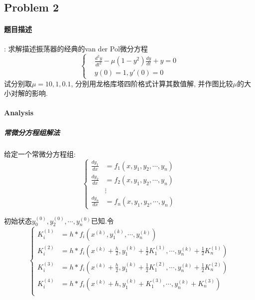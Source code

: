 \documentclass{article}
\begin{document}
\begin{CJK*}{UTF8}{song}
		\subsection{Problem 2}
			\paragraph{题目描述}
			:\newline
			求解描述振荡器的经典的van der Pol微分方程
			$$\left\{
				\begin{aligned}
					& \frac{d^2 y}{dt^2} - \mu \left(1-y^2 \right) \frac{dy}{dt} + y = 0 \\
					& y\left(0\right) = 1, y'\left(0 \right) = 0
				\end{aligned}
			\right.$$
			试分别取$\mu = 10, 1, 0.1$, 分别用龙格库塔四阶格式计算其数值解, 并作图比较$\mu$的大小对解的影响.
			
			\paragraph{Analysis}
			
			\subparagraph{常微分方程组解法}
			给定一个常微分方程组:
			$$\left\{
				\begin{aligned}
					\frac{dy_1}{dx} &= f_1\left(x,y_1,y_2,\cdots,y_n \right) \\
					\frac{dy_2}{dx} &= f_2\left(x,y_1,y_2,\cdots,y_n \right) \\
					&\vdots \\
					\frac{dy_n}{dx} &= f_n\left(x,y_1,y_2,\cdots,y_n \right)
				\end{aligned}
			\right.$$
			
			初始状态$y_0^{\left(0\right)}, y_2^{\left(0\right)}, \cdots, y_n^{\left(0\right)}$已知.令$$
			\left\{
				\begin{aligned}
					K_{i}^{\left(1\right)} &= h * f_i\left(x^{\left(k\right)},y_1^{\left(k\right)},\cdots,y_n^{\left(k\right)}\right) \\
					K_{i}^{\left(2\right)} &= h * f_i\left(x^{\left(k\right)} + \frac{h}{2}, y_1^{\left(k\right)} + \frac{1}{2}K_{1}^{\left(1\right)}, \cdots, y_n^{\left(k\right)} + \frac{1}{2}K_{n}^{\left(1\right)}\right) \\
					K_{i}^{\left(3\right)} &= h * f_i\left(x^{\left(k\right)} + \frac{h}{2}, y_1^{\left(k\right)} + \frac{1}{2}K_{1}^{\left(2\right)}, \cdots, y_n^{\left(k\right)} + \frac{1}{2}K_{n}^{\left(2\right)}\right) \\
					K_{i}^{\left(4\right)} &= h * f_i\left(x^{\left(k\right)} + h, y_1^{\left(k\right)} + K_{1}^{\left(3\right)}, \cdots, y_n^{\left(k\right)} + K_{n}^{\left(3\right)}\right) \\										
				\end{aligned}
			\right.$$
			

\end{CJK*}
\end{document}

